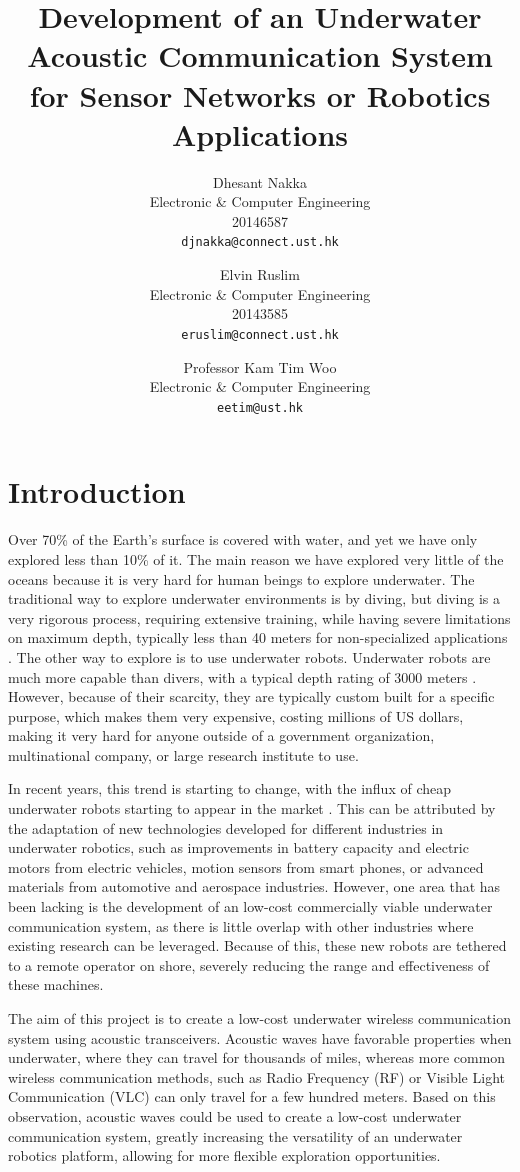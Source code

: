 \documentclass[12pt,a4paper,titlepage]{article}
\title{Development of an Underwater Acoustic Communication System for Sensor Networks or Robotics Applications}
\author{
  Dhesant Nakka \\
  Electronic \& Computer Engineering \\
  20146587 \\
  \texttt{djnakka@connect.ust.hk}
  \and
  Elvin Ruslim \\
  Electronic \& Computer Engineering \\
  20143585 \\
  \texttt{eruslim@connect.ust.hk}
  \and
  Professor Kam Tim Woo \\
  Electronic \& Computer Engineering \\
  \texttt{eetim@ust.hk}
}
\begin{document}
\maketitle


\tableofcontents
\listoffigures
\listoftables

\newpage
{} %

\section{Introduction}\label{sec:intro}
Over 70\% of the Earth’s surface is covered with water, and yet we have only explored less than 10\% of it. The main reason we have explored very little of the oceans because it is very hard for human beings to explore underwater. The traditional way to explore underwater environments is by diving, but diving is a very rigorous process, requiring extensive training, while having severe limitations on maximum depth, typically less than 40 meters for non-specialized applications \cite{padi}. The other way to explore is to use underwater robots. Underwater robots are much more capable than divers, with a typical depth rating of 3000 meters \cite{oe_rov}. However, because of their scarcity, they are typically custom built for a specific purpose, which makes them very expensive, costing millions of US dollars, making it very hard for anyone outside of a government organization, multinational company, or large research institute to use.

In recent years, this trend is starting to change, with the influx of cheap underwater robots starting to appear in the market \cite{trident,fathomone,ccrov}. This can be attributed by the adaptation of new technologies developed for different industries in underwater robotics, such as improvements in battery capacity and electric motors from electric vehicles, motion sensors from smart phones, or advanced materials from automotive and aerospace industries. However, one area that has been lacking is the development of an low-cost commercially viable underwater communication system, as there is little overlap with other industries where existing research can be leveraged. Because of this, these new robots are tethered to a remote operator on shore, severely reducing the range and effectiveness of these machines.

The aim of this project is to create a low-cost underwater wireless communication system using acoustic transceivers. Acoustic waves have favorable properties when underwater, where they can travel for thousands of miles, whereas more common wireless communication methods, such as Radio Frequency (RF) or Visible Light Communication (VLC) can only travel for a few hundred meters. Based on this observation, acoustic waves could be used to create a low-cost underwater communication system, greatly increasing the versatility of an underwater robotics platform, allowing for more flexible exploration opportunities.
\end{document}
